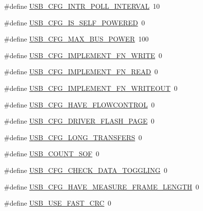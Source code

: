 \begin{DoxyCompactItemize}
\item 
\#define \hyperlink{usbconfig-prototype_8h_a9cccddfefa62f926a0d7bba9f183a4d3}{U\-S\-B\-\_\-\-C\-F\-G\-\_\-\-I\-N\-T\-R\-\_\-\-P\-O\-L\-L\-\_\-\-I\-N\-T\-E\-R\-V\-A\-L}~10
\item 
\#define \hyperlink{usbconfig-prototype_8h_ad5fd70b5fabd8abd34d5b9ef7100b709}{U\-S\-B\-\_\-\-C\-F\-G\-\_\-\-I\-S\-\_\-\-S\-E\-L\-F\-\_\-\-P\-O\-W\-E\-R\-E\-D}~0
\item 
\#define \hyperlink{usbconfig-prototype_8h_abe324d9b00dc186bcbac65ed0f94811c}{U\-S\-B\-\_\-\-C\-F\-G\-\_\-\-M\-A\-X\-\_\-\-B\-U\-S\-\_\-\-P\-O\-W\-E\-R}~100
\item 
\#define \hyperlink{usbconfig-prototype_8h_a7f117e204e14ff1028ada59f622173f2}{U\-S\-B\-\_\-\-C\-F\-G\-\_\-\-I\-M\-P\-L\-E\-M\-E\-N\-T\-\_\-\-F\-N\-\_\-\-W\-R\-I\-T\-E}~0
\item 
\#define \hyperlink{usbconfig-prototype_8h_a6be8d20f2d0eb0e87460b26681e60611}{U\-S\-B\-\_\-\-C\-F\-G\-\_\-\-I\-M\-P\-L\-E\-M\-E\-N\-T\-\_\-\-F\-N\-\_\-\-R\-E\-A\-D}~0
\item 
\#define \hyperlink{usbconfig-prototype_8h_afebecafb2986c559a5d346d601be9de3}{U\-S\-B\-\_\-\-C\-F\-G\-\_\-\-I\-M\-P\-L\-E\-M\-E\-N\-T\-\_\-\-F\-N\-\_\-\-W\-R\-I\-T\-E\-O\-U\-T}~0
\item 
\#define \hyperlink{usbconfig-prototype_8h_a5495a12e572cdaa8e11358f92d1b324f}{U\-S\-B\-\_\-\-C\-F\-G\-\_\-\-H\-A\-V\-E\-\_\-\-F\-L\-O\-W\-C\-O\-N\-T\-R\-O\-L}~0
\item 
\#define \hyperlink{usbconfig-prototype_8h_ac0335c6066303683807fc117e336e7c4}{U\-S\-B\-\_\-\-C\-F\-G\-\_\-\-D\-R\-I\-V\-E\-R\-\_\-\-F\-L\-A\-S\-H\-\_\-\-P\-A\-G\-E}~0
\item 
\#define \hyperlink{usbconfig-prototype_8h_a7a4d92baced8a64f4c150b9b59d20844}{U\-S\-B\-\_\-\-C\-F\-G\-\_\-\-L\-O\-N\-G\-\_\-\-T\-R\-A\-N\-S\-F\-E\-R\-S}~0
\item 
\#define \hyperlink{usbconfig-prototype_8h_a93e719c32f721d3e4b2dd5ba776da40b}{U\-S\-B\-\_\-\-C\-O\-U\-N\-T\-\_\-\-S\-O\-F}~0
\item 
\#define \hyperlink{usbconfig-prototype_8h_a343f7b4bd7f8ba0348e106ef0f434215}{U\-S\-B\-\_\-\-C\-F\-G\-\_\-\-C\-H\-E\-C\-K\-\_\-\-D\-A\-T\-A\-\_\-\-T\-O\-G\-G\-L\-I\-N\-G}~0
\item 
\#define \hyperlink{usbconfig-prototype_8h_a64864300fd8efb3c8d636b5c52f46fe7}{U\-S\-B\-\_\-\-C\-F\-G\-\_\-\-H\-A\-V\-E\-\_\-\-M\-E\-A\-S\-U\-R\-E\-\_\-\-F\-R\-A\-M\-E\-\_\-\-L\-E\-N\-G\-T\-H}~0
\item 
\#define \hyperlink{usbconfig-prototype_8h_a056ce5afad0b0620c90bab5bd81e4166}{U\-S\-B\-\_\-\-U\-S\-E\-\_\-\-F\-A\-S\-T\-\_\-\-C\-R\-C}~0

\end{DoxyCompactItemize}
